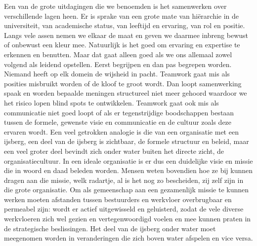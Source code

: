 \documentclass[empirical, authordate, ]{new-jote-article}
\begin{document}
	Een van de grote uitdagingen die we benoemden is het samenwerken over verschillende lagen heen. Er is sprake van een grote mate van hiërarchie in de universiteit, van academische status, van leeftijd en ervaring, van rol en positie. Langs vele assen nemen we elkaar de maat en geven we daarmee inbreng bewust of onbewust een kleur mee. Natuurlijk is het goed om ervaring en expertise te erkennen en benutten. Maar dat gaat alleen goed als we ons allemaal zowel volgend als leidend opstellen. Eerst begrijpen en dan pas begrepen worden. Niemand heeft op elk domein de wijsheid in pacht. Teamwork gaat mis als posities misbruikt worden of de kloof te groot wordt. Dan loopt samenwerking spaak en worden bepaalde meningen structureel niet meer gehoord waardoor we het risico lopen blind spots te ontwikkelen. Teamwork gaat ook mis als communicatie niet goed loopt of als er tegenstrijdige boodschappen bestaan tussen de formele, gewenste visie en communicatie en de cultuur zoals deze ervaren wordt. Een veel getrokken analogie is die van een organisatie met een ijsberg, een deel van de ijsberg is zichtbaar, de formele structuur en beleid, maar een veel groter deel bevindt zich onder water buiten het directe zicht, de organisatiecultuur. In een ideale organisatie is er dus een duidelijke visie en missie die in woord en daad beleden worden. Mensen weten bovendien hoe ze bij kunnen dragen aan die missie, welk radartje, al is het nog zo bescheiden, zij zelf zijn in die grote organisatie. Om als gemeenschap aan een gezamenlijk missie te kunnen werken moeten afstanden tussen bestuurders en werkvloer overbrugbaar en permeabel zijn: wordt er actief uitgewisseld en geluisterd, zodat de vele diverse werkvloeren zich wel gezien en vertegenwoordigd voelen en mee kunnen praten in de strategische beslissingen. Het deel van de ijsberg onder water moet meegenomen worden in veranderingen die zich boven water afspelen en vice versa.
\end{document}
